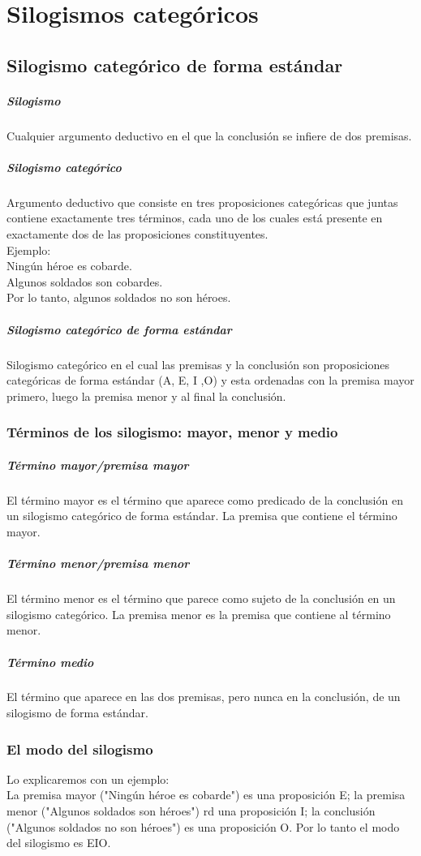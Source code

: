 \documentclass[10pt]{book} 						%
\begin{document}
\section{Silogismos categóricos}
\subsection{Silogismo categórico de forma estándar}
\subparagraph{Silogismo}
Cualquier argumento deductivo en el que la conclusión se infiere de dos premisas.
\subparagraph{Silogismo categórico}
Argumento deductivo que consiste en tres proposiciones categóricas que juntas contiene exactamente tres términos, cada uno de los cuales está presente en exactamente dos de las proposiciones constituyentes.\\
Ejemplo:\\
Ningún héroe es cobarde.\\
Algunos soldados son cobardes.\\
Por lo tanto, algunos soldados no son héroes.\\
\subparagraph{Silogismo categórico de forma estándar}
Silogismo categórico en el cual las premisas y la conclusión son proposiciones categóricas de forma estándar (A, E, I ,O) y esta ordenadas con la premisa mayor primero, luego la premisa menor y al final la conclusión.
\subsubsection{Términos de los silogismo: mayor, menor y medio}
\subparagraph{Término mayor/premisa mayor}
El término mayor es el término que aparece como predicado de la conclusión en un silogismo categórico de forma estándar. La premisa que contiene el término mayor.
\subparagraph{Término menor/premisa menor}
El término menor es el término que parece como sujeto de la conclusión en un silogismo categórico. La premisa menor es la premisa que contiene al término menor.
\subparagraph{Término medio}
El término que aparece en las dos premisas, pero nunca en la conclusión, de un silogismo de forma estándar.
\subsubsection{El modo del silogismo}
Lo explicaremos con un ejemplo:\\
La premisa mayor ("Ningún héroe es cobarde") es una proposición E; la premisa menor ("Algunos soldados son héroes") rd una proposición I; la conclusión ("Algunos soldados no son héroes") es una proposición O. Por lo tanto el modo del silogismo es EIO.
\end{document}

